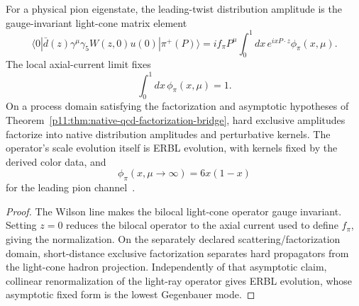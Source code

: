 \documentclass[12pt,a4paper]{article}
\begin{document}
\begin{theorem}
\label{p11:thm:native-distribution-amplitude-export}
For a physical pion eigenstate, the leading-twist distribution amplitude is the gauge-invariant light-cone matrix element
\begin{equation}
\label{p11:eq:pion-da-definition}
\langle0|\bar d(z)\gamma^\mu\gamma_5W(z,0)u(0)|\pi^+(P)\rangle
=i f_\pi P^\mu\int_0^1 dx\,e^{ixP\cdot z}\phi_\pi(x,\mu).
\end{equation}
The local axial-current limit fixes
\begin{equation}
\label{p11:eq:pion-da-normalization}
\int_0^1dx\,\phi_\pi(x,\mu)=1.
\end{equation}
On a process domain satisfying the factorization and asymptotic hypotheses of
Theorem~\ref{p11:thm:native-qcd-factorization-bridge}, hard exclusive amplitudes
factorize into native distribution amplitudes and perturbative kernels.  The
operator's scale evolution itself is ERBL evolution, with kernels fixed by the
derived color data, and
\begin{equation}
\label{p11:eq:pion-da-asymptotic}
\phi_\pi(x,\mu\to\infty)=6x(1-x)
\end{equation}
for the leading pion channel~\cite{EfremovRadyushkin1980,LepageBrodsky1980}.
\end{theorem}
\begin{proof}
The Wilson line makes the bilocal light-cone operator gauge invariant.  Setting
\(z=0\) reduces the bilocal operator to the axial current used to define
\(f_\pi\), giving the normalization.  On the separately declared
scattering/factorization domain, short-distance exclusive factorization
separates hard propagators from the light-cone hadron projection.  Independently
of that asymptotic claim, collinear renormalization of the light-ray operator
gives ERBL evolution, whose asymptotic fixed form is the lowest Gegenbauer mode.
\end{proof}
\end{document}
